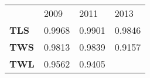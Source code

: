 \documentclass[]{article}
\begin{document}
\begin{longtable}[c]{@{}llll@{}}
\toprule\addlinespace
\begin{minipage}[b]{0.12\columnwidth}\raggedright
~
\end{minipage} & \begin{minipage}[b]{0.09\columnwidth}\raggedright
2009
\end{minipage} & \begin{minipage}[b]{0.09\columnwidth}\raggedright
2011
\end{minipage} & \begin{minipage}[b]{0.09\columnwidth}\raggedright
2013
\end{minipage}
\\\addlinespace
\midrule\endhead
\begin{minipage}[t]{0.12\columnwidth}\raggedright
\textbf{TLS}
\end{minipage} & \begin{minipage}[t]{0.09\columnwidth}\raggedright
0.9968
\end{minipage} & \begin{minipage}[t]{0.09\columnwidth}\raggedright
0.9901
\end{minipage} & \begin{minipage}[t]{0.09\columnwidth}\raggedright
0.9846
\end{minipage}
\\\addlinespace
\begin{minipage}[t]{0.12\columnwidth}\raggedright
\textbf{TWS}
\end{minipage} & \begin{minipage}[t]{0.09\columnwidth}\raggedright
0.9813
\end{minipage} & \begin{minipage}[t]{0.09\columnwidth}\raggedright
0.9839
\end{minipage} & \begin{minipage}[t]{0.09\columnwidth}\raggedright
0.9157
\end{minipage}
\\\addlinespace
\begin{minipage}[t]{0.12\columnwidth}\raggedright
\textbf{TWL}
\end{minipage} & \begin{minipage}[t]{0.09\columnwidth}\raggedright
0.9562
\end{minipage} & \begin{minipage}[t]{0.09\columnwidth}\raggedright
0.9405
\end{minipage} & \begin{minipage}[t]{0.09\columnwidth}\raggedright

\end{minipage}
\end{longtable}
\end{document}
